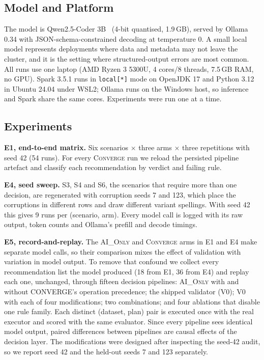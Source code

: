 \subsection{Model and Platform}
The model is Qwen2.5-Coder 3B~\cite{hui2024qwencoder} (4-bit quantised, 1.9\,GB), served by Ollama 0.34 with JSON-schema-constrained decoding at temperature 0. A small local model represents deployments where data and metadata may not leave the cluster, and it is the setting where structured-output errors are most common. All runs use one laptop (AMD Ryzen 3 5300U, 4 cores/8 threads, 7.5\,GB RAM, no GPU). Spark 3.5.1 runs in \texttt{local[*]} mode on OpenJDK 17 and Python 3.12 in Ubuntu 24.04 under WSL2; Ollama runs on the Windows host, so inference and Spark share the same cores. Experiments were run one at a time.

\subsection{Experiments}
\noindent\textbf{E1, end-to-end matrix.} Six scenarios $\times$ three arms $\times$ three repetitions with seed 42 (54 runs). For every \textsc{Converge} run we reload the persisted pipeline artefact and classify each recommendation by verdict and failing rule.

\noindent\textbf{E4, seed sweep.} S3, S4 and S6, the scenarios that require more than one decision, are regenerated with corruption seeds 7 and 123, which place the corruptions in different rows and draw different variant spellings. With seed 42 this gives 9 runs per (scenario, arm). Every model call is logged with its raw output, token counts and Ollama's prefill and decode timings.

\noindent\textbf{E5, record-and-replay.} The \textsc{AI\_Only} and \textsc{Converge} arms in E1 and E4 make separate model calls, so their comparison mixes the effect of validation with variation in model output. To remove that confound we collect every recommendation list the model produced (18 from E1, 36 from E4) and replay each one, unchanged, through fifteen decision pipelines: \textsc{AI\_Only} with and without CONVERGE's operation precedence; the shipped validator (V0); V0 with each of four modifications; two combinations; and four ablations that disable one rule family. Each distinct (dataset, plan) pair is executed once with the real executor and scored with the same evaluator. Since every pipeline sees identical model output, paired differences between pipelines are causal effects of the decision layer. The modifications were designed after inspecting the seed-42 audit, so we report seed 42 and the held-out seeds 7 and 123 separately.

